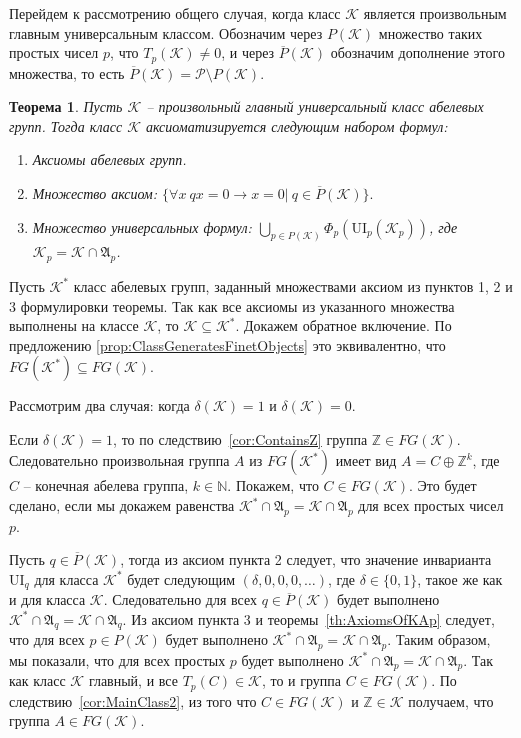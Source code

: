 \documentclass[a4paper,11pt,twoside]{article}
\newtheorem{theorem}{Теорема}[section]
\def\proof{{\noindent{\bf Доказательство.}} }
\def\A{{\mathfrak{A}}}
\def\K{{\mathcal{K}}}
\def\P{{\mathcal{P}}}
\def\Z{{\mathbb{Z}}}
\def\N{{\mathbb{N}}}
\def\ui{{\mathrm{UI}}}
\begin{document}
Перейдем к рассмотрению общего случая, когда класс $\K$ является произвольным главным универсальным классом. Обозначим через $P(\K)$ множество таких простых чисел $p$, что $T_p(\K) \neq 0$, и через $\overline{P}(\K)$ обозначим дополнение этого множества, то есть $\overline{P}(\K) = \P \setminus P(\K).$

\begin{theorem}\label{th:AxiomsOfK}
Пусть $\K$ -- произвольный главный универсальный класс абелевых групп. Тогда класс $\K$ аксиоматизируется следующим набором формул:
\begin{enumerate}
\item Аксиомы абелевых групп.
\item Множество аксиом: $\{ \forall x \ qx = 0 \rightarrow x = 0 | \ q \in \overline{P}(\K) \}.$
\item Множество универсальных формул: $\bigcup\limits_{p \in P(\K)} \Phi_p(\ui_p(\K_p))$, где $\K_p = \K \cap \A_p$.
\end{enumerate}

\end{theorem}

\proof Пусть $\K^*$ класс абелевых групп, заданный множествами аксиом из пунктов 1, 2 и 3 формулировки  теоремы. Так как все аксиомы из указанного множества выполнены на классе $\K$, то $\K \subseteq \K^*$. Докажем обратное включение. По предложению \ref{prop:ClassGeneratesFinetObjects} это эквивалентно, что $FG(\K^*) \subseteq FG(\K)$. 

Рассмотрим два случая: когда $\delta(\K) = 1$ и $\delta(\K) = 0$.

Если $\delta(\K) = 1$, то по следствию~\ref{cor:ContainsZ} группа $\Z \in FG(\K)$. Следовательно произвольная группа $A$ из $FG(\K^*)$ имеет вид $A = C \oplus \Z^k$, где $C$ -- конечная абелева группа, $k \in \N$. Покажем, что $C \in FG(\K)$. Это будет сделано, если мы докажем равенства $\K^* \cap \A_p = \K \cap \A_p$ для всех простых чисел $p$.

Пусть $q \in \overline{P}(\K)$, тогда из аксиом пункта 2 следует, что значение инварианта $\ui_q$ для класса $\K^*$ будет следующим $(\delta, 0, 0, 0, \ldots)$, где $\delta \in \{0, 1\}$, такое же как и для класса $\K$. Следовательно для всех $q \in \overline{P}(\K)$ будет выполнено $\K^* \cap \A_q = \K \cap \A_q.$ Из аксиом пункта 3 и теоремы~\ref{th:AxiomsOfKAp} следует, что для всех $p \in P(\K)$ будет выполнено $\K^* \cap \A_p = \K \cap \A_p.$ Таким образом, мы показали, что для всех простых $p$ будет выполнено $\K^* \cap \A_p = \K \cap \A_p.$ Так как класс $\K$ главный, и все $T_p(C) \in \K$, то и группа $C \in FG(\K)$. По следствию~\ref{cor:MainClass2}, из того что $C \in FG(\K)$ и $\Z \in \K$ получаем, что группа $A \in FG(\K).$
\end{document}

